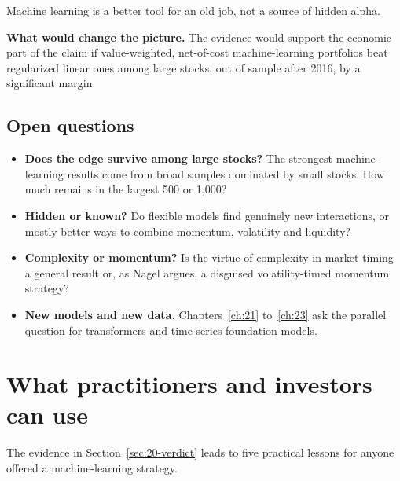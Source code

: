 Machine learning is a better tool for an old job, not a source of hidden alpha.

\textbf{What would change the picture.} The evidence would support the economic part of the claim if value-weighted, net-of-cost machine-learning portfolios beat regularized linear ones among large stocks, out of sample after 2016, by a significant margin.

\subsection{Open questions}
\label{sec:20-open}

\begin{itemize}
  \item \textbf{Does the edge survive among large stocks?} The strongest machine-learning results come from broad samples dominated by small stocks. How much remains in the largest 500 or 1,000?
  \item \textbf{Hidden or known?} Do flexible models find genuinely new interactions, or mostly better ways to combine momentum, volatility and liquidity?
  \item \textbf{Complexity or momentum?} Is the virtue of complexity in market timing a general result or, as Nagel argues, a disguised volatility-timed momentum strategy?
  \item \textbf{New models and new data.} Chapters~\ref{ch:21} to~\ref{ch:23} ask the parallel question for transformers and time-series foundation models.
\end{itemize}

\section{What practitioners and investors can use}
\label{sec:20-investors}

The evidence in Section~\ref{sec:20-verdict} leads to five practical lessons for anyone offered a machine-learning strategy.

